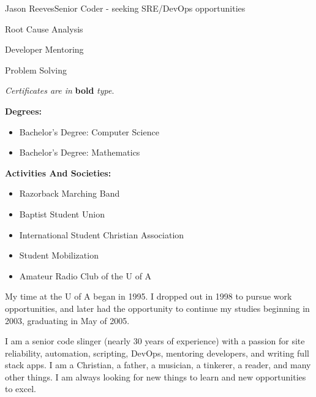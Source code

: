 \documentclass{article}
\begin{document}
\begin{cv}[avatar]{Jason Reeves}{Senior Coder - seeking SRE/DevOps opportunities}
\cvseparator
\begin{cvitem}
  \footnotesize Root Cause Analysis
\end{cvitem}

\cvseparator
\begin{cvitem}
  \footnotesize Developer Mentoring
\end{cvitem}

\cvseparator
\begin{cvitem}
  \footnotesize Problem Solving
\end{cvitem}

\begin{center}
  \footnotesize * \textit{Certificates are in} \textbf{bold} \textit{type}.
\end{center}
\vspace{-3mm}


\textbf{Degrees:}
\begin{itemize}
  \item Bachelor's Degree: Computer Science
  \item Bachelor's Degree: Mathematics
\end{itemize}
\vspace*{3mm}
\textbf{Activities And Societies:}
\begin{itemize}
  \item Razorback Marching Band
  \item Baptist Student Union
  \item International Student Christian Association
  \item Student Mobilization
  \item Amateur Radio Club of the U of A
\end{itemize}
\vspace*{3mm}
\begin{center}
\footnotesize My time at the U of A began in 1995. I dropped out in 1998 to pursue work opportunities, and later had the opportunity to continue my studies beginning in 2003, graduating in May of 2005.
\end{center}

\switchcolumn
\renewcommand{\iscvsidebar}{0}

I am a senior code slinger (nearly 30 years of experience) with a passion for site reliability, automation, scripting, DevOps, mentoring developers, and writing full stack apps. I am a Christian, a father, a musician, a tinkerer, a reader, and many other things. I am always looking for new things to learn and new opportunities to excel.
\vspace*{3mm}


\end{cv}
\end{document}
